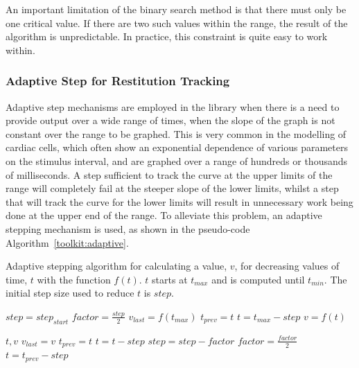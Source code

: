 An important limitation of the binary search method is that there must only be
one critical value.
If there are two such values within the range, the result of the algorithm is
unpredictable.
In practice, this constraint is quite easy to work within.

\subsubsection{Adaptive Step for Restitution Tracking}

Adaptive step mechanisms are employed in the library when there is a need to
provide output over a wide range of times, when the slope of the graph is not
constant over the range to be graphed.  This is very common in the modelling of
cardiac cells, which often show an exponential dependence of various parameters
on the  stimulus interval, and are graphed over a range of hundreds or thousands
of milliseconds.  A step sufficient to track the curve at the upper limits
of the range will completely fail at the steeper slope of the lower limits,
whilst a step that will track the curve for the lower limits will result in
unnecessary work being done at the upper end of the range.  To alleviate this
problem, an adaptive stepping mechanism is used, as shown in the pseudo-code
Algorithm~\ref{toolkit:adaptive}.

\begin{algorithm}
\caption{
Adaptive stepping algorithm for calculating a value, $v$, for decreasing values
of time, $t$ with the function $f\!\left(t\right)$.
$t$ starts at $t_{max}$ and is computed until $t_{min}$.
The initial step size used to reduce $t$ is $step$.
}
\label{toolkit:adaptive}
\begin{algorithmic}
\STATE $step = step_{start}$
\STATE $factor = \frac{step}{2}$
\STATE $v_{last} = f\!\left(t_{max}\right)$
\STATE $t_{prev} = t$
\STATE $t = t_{max} - step$
    \STATE $v = f\!\left(t\right)$

        \PRINT $t, v$
        \STATE $v_{last} = v$
        \STATE $t_{prev} = t$
        \STATE $t = t - step$
    \ELSE
        \STATE $step = step - factor$
        \STATE $factor = \frac{factor}{2}$
        \STATE $t = t_{prev} - step$
    \ENDIF
\ENDWHILE
\end{algorithmic}
\end{algorithm}

